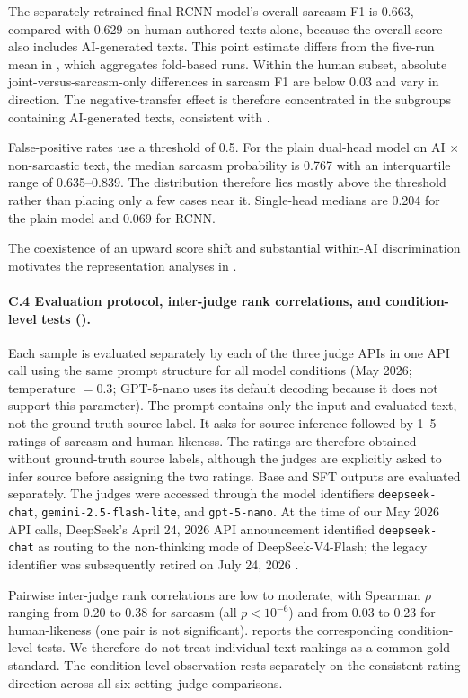 The separately retrained final RCNN model's overall sarcasm F1 is 0.663, compared with 0.629 on human-authored texts alone, because the overall score also includes AI-generated texts. This point estimate differs from the five-run mean in , which aggregates fold-based runs. Within the human subset, absolute joint-versus-sarcasm-only differences in sarcasm F1 are below 0.03 and vary in direction. The negative-transfer effect is therefore concentrated in the subgroups containing AI-generated texts, consistent with .

False-positive rates use a threshold of 0.5. For the plain dual-head model on AI $\times$ non-sarcastic text, the median sarcasm probability is 0.767 with an interquartile range of 0.635--0.839. The distribution therefore lies mostly above the threshold rather than placing only a few cases near it. Single-head medians are 0.204 for the plain model and 0.069 for RCNN.

The coexistence of an upward score shift and substantial within-AI discrimination motivates the representation analyses in .

\label{app:c4}\paragraph{C.4 Evaluation protocol, inter-judge rank correlations, and condition-level tests ().} Each sample is evaluated separately by each of the three judge APIs in one API call using the same prompt structure for all model conditions (May 2026; temperature $= 0.3$; GPT-5-nano uses its default decoding because it does not support this parameter). The prompt contains only the input and evaluated text, not the ground-truth source label. It asks for source inference followed by 1--5 ratings of sarcasm and human-likeness. The ratings are therefore obtained without ground-truth source labels, although the judges are explicitly asked to infer source before assigning the two ratings. Base and SFT outputs are evaluated separately. The judges were accessed through the model identifiers \texttt{deepseek-chat}, \texttt{gemini-2.5-flash-lite}, and \texttt{gpt-5-nano}. At the time of our May 2026 API calls, DeepSeek's April 24, 2026 API announcement identified \texttt{deepseek-chat} as routing to the non-thinking mode of DeepSeek-V4-Flash; the legacy identifier was subsequently retired on July 24, 2026 \citep{deepseek2026v4flash}.

Pairwise inter-judge rank correlations are low to moderate, with Spearman $\rho$ ranging from 0.20 to 0.38 for sarcasm (all $p < 10^{-6}$) and from 0.03 to 0.23 for human-likeness (one pair is not significant).  reports the corresponding condition-level tests. We therefore do not treat individual-text rankings as a common gold standard. The condition-level observation rests separately on the consistent rating direction across all six setting--judge comparisons.

